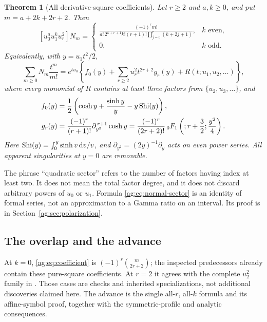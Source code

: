 \documentclass[11pt,letterpaper]{article}
\numberwithin{equation}{section}
\newtheorem{theorem}{Theorem}[section]
\theoremstyle{definition}\newtheorem{definition}[theorem]{Definition}
\theoremstyle{remark}\newtheorem{remark}[theorem]{Remark}
\newcommand{\dd}{\,\mathrm d}\newcommand{\ii}{\mathrm i}
\newcommand{\piy}{\partial_{y^2}}
\begin{document}
\begin{theorem}[All derivative-square coefficients]\label{ag:thm:main}
Let $r\ge2$ and $a,k\ge0$, and put $m=a+2k+2r+2$. Then
\begin{equation}\label{ag:eq:coefficient}
 \boxed{
 [u_0^a u_1^k u_r^2]N_m=
 \begin{cases}
 \displaystyle
 \frac{(-1)^r m!}
 {a!\,2^{k+r+1}k!(r+1)!\prod_{j=0}^{r}(k+2j+1)},&k\text{ even},\\[7pt]
 0,&k\text{ odd}.
 \end{cases}}
\end{equation}
Equivalently, with $y=u_1t^2/2$,
\begin{equation}\label{ag:eq:normal-sector}
 \sum_{m\ge0}N_m\frac{t^m}{m!}
 =e^{tu_0}\left\{f_0(y)+\sum_{r\ge2}u_r^2t^{2r+2}g_r(y)
                          +R(t;u_1,u_2,\ldots)\right\},
\end{equation}
where every monomial of $R$ contains at least three factors from
$\{u_2,u_3,\ldots\}$, and
\begin{align}
 f_0(y)&=\frac12\left(\cosh y+\frac{\sinh y}{y}-y\Shi(y)\right),
       \label{ag:eq:f0-intro}\\
 g_r(y)&=\frac{(-1)^r}{(r+1)!}\piy^{\,r+1}\cosh y
 =\frac{(-1)^r}{(2r+2)!}\,{}_0F_1\left(;r+\frac32;\frac{y^2}{4}\right).
       \label{ag:eq:gr-intro}
\end{align}
Here $\Shi(y)=\int_0^y\sinh v\dd v/v$, and
$\piy=(2y)^{-1}\partial_y$ acts on even power series. All apparent
singularities at $y=0$ are removable.
\end{theorem}

The phrase ``quadratic sector'' refers to the number of factors having
index at least two. It does not mean the total factor degree, and it does
not discard arbitrary powers of $u_0$ or $u_1$. Formula
\eqref{ag:eq:normal-sector} is an identity of formal series, not an
approximation to a Gamma ratio on an interval. Its proof is in
Section~\ref{ag:sec:polarization}.

\subsection{The overlap and the advance}

At $k=0$, \eqref{ag:eq:coefficient} is
$(-1)^r\binom{m}{2r+2}$; the inspected predecessors already contain
these pure-square coefficients. At $r=2$ it agrees with the complete
$u_2^2$ family in \cite[Section~4]{HTG}. Those cases are checks and
inherited specializations, not additional discoveries claimed here.
The advance is the single all-$r$, all-$k$ formula and its affine-symbol
proof, together with the symmetric-profile and analytic consequences.
\end{document}
